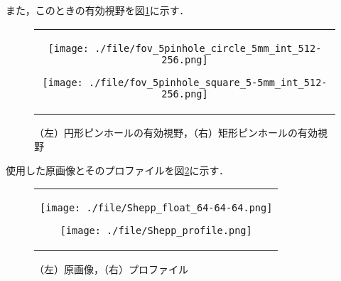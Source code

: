 \documentclass[dvipdfmx,autodetect-engine,twocolumn,10pt]{jsarticle}%
\begin{document}
また，このときの有効視野を図\ref{fov}に示す．
\begin{figure}[htbp]
  \begin{center}
    \begin{tabular}{c}

      \begin{minipage}{0.5\hsize}
        \begin{center}
          \texttt{[image: ./file/fov\_5pinhole\_circle\_5mm\_int\_512-256.png]}
        \end{center}
      \end{minipage}

      \begin{minipage}{0.5\hsize}
        \begin{center}
          \texttt{[image: ./file/fov\_5pinhole\_square\_5-5mm\_int\_512-256.png]}
        \end{center}
      \end{minipage}

    \end{tabular}
  \caption{（左）円形ピンホールの有効視野，（右）矩形ピンホールの有効視野}
  \label{fov}
  \end{center}
\end{figure}

使用した原画像とそのプロファイルを図\ref{original_img}に示す．
\begin{figure}[htbp]
  \begin{center}
    \begin{tabular}{c}

      \begin{minipage}{0.5\hsize}
        \begin{center}
          \texttt{[image: ./file/Shepp\_float\_64-64-64.png]}
        \end{center}
      \end{minipage}

      \begin{minipage}{0.5\hsize}
        \begin{center}
          \texttt{[image: ./file/Shepp\_profile.png]}
        \end{center}
      \end{minipage}

    \end{tabular}
  \caption{（左）原画像，（右）プロファイル}
  \label{original_img}
  \end{center}
\end{figure}
\end{document}

